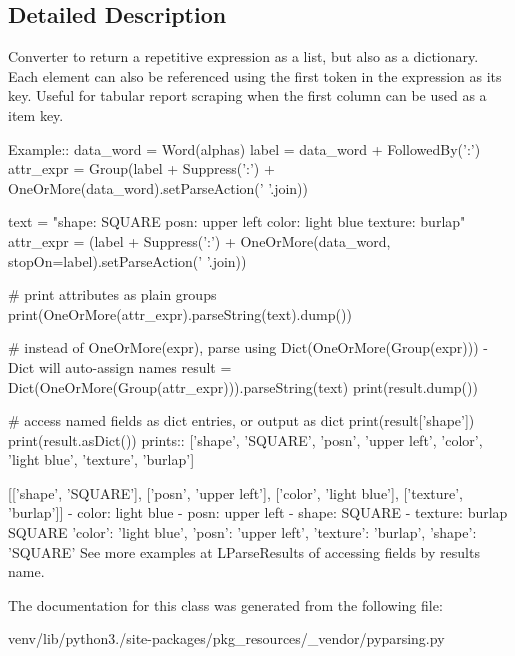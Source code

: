 \subsection{Detailed Description}
\begin{DoxyVerb}Converter to return a repetitive expression as a list, but also as a dictionary.
Each element can also be referenced using the first token in the expression as its key.
Useful for tabular report scraping when the first column can be used as a item key.

Example::
    data_word = Word(alphas)
    label = data_word + FollowedBy(':')
    attr_expr = Group(label + Suppress(':') + OneOrMore(data_word).setParseAction(' '.join))

    text = "shape: SQUARE posn: upper left color: light blue texture: burlap"
    attr_expr = (label + Suppress(':') + OneOrMore(data_word, stopOn=label).setParseAction(' '.join))
    
    # print attributes as plain groups
    print(OneOrMore(attr_expr).parseString(text).dump())
    
    # instead of OneOrMore(expr), parse using Dict(OneOrMore(Group(expr))) - Dict will auto-assign names
    result = Dict(OneOrMore(Group(attr_expr))).parseString(text)
    print(result.dump())
    
    # access named fields as dict entries, or output as dict
    print(result['shape'])        
    print(result.asDict())
prints::
    ['shape', 'SQUARE', 'posn', 'upper left', 'color', 'light blue', 'texture', 'burlap']

    [['shape', 'SQUARE'], ['posn', 'upper left'], ['color', 'light blue'], ['texture', 'burlap']]
    - color: light blue
    - posn: upper left
    - shape: SQUARE
    - texture: burlap
    SQUARE
    {'color': 'light blue', 'posn': 'upper left', 'texture': 'burlap', 'shape': 'SQUARE'}
See more examples at L{ParseResults} of accessing fields by results name.
\end{DoxyVerb}
 

The documentation for this class was generated from the following file\+:\begin{DoxyCompactItemize}
\item 
venv/lib/python3./site-\/packages/pkg\+\_\+resources/\+\_\+vendor/pyparsing.\+py\end{DoxyCompactItemize}
